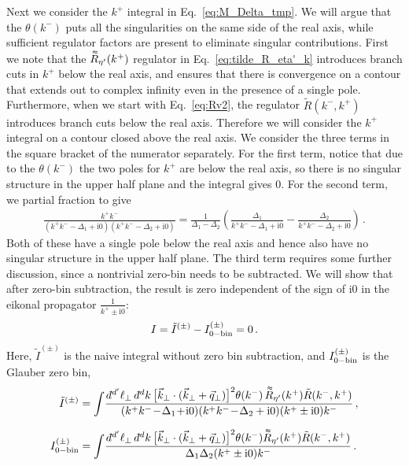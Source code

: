 \documentclass[letterpaper,11pt]{article}
\newcommand{\dbtilde}[1]{\accentset{\approx}{#1}}
\newcommand{\eq}[1]{Eq.~\eqref{eq:#1}}
\newcommand{\img}{\mathrm{i}}
\newcommand{\dbar}{d\hspace*{-0.08em}\bar{}\hspace*{0.1em}}
\begin{document}
Next we consider the $k^+$ integral in \eq{M_Delta_tmp}.
We will argue that the $\theta(k^-)$ puts all the singularities on the same side of the real axis, while sufficient regulator factors are present to eliminate singular contributions.   
First we note that the $\dbtilde R_{\eta'}(k^+)$ regulator in \eq{tilde_R_eta'_k} introduces branch cuts in $k^+$ below the real axis, and ensures that there is convergence on a contour that extends out to complex infinity even in the presence of a single pole. Furthermore, when we start with \eq{Rv2}, the regulator $\tilde R(k^-,k^+)$ introduces branch cuts below the real axis.
Therefore we will consider the $k^+$ integral on a contour closed above the real axis. We consider the three terms in the square bracket of the numerator separately.
For the first term, notice that due to the $\theta(k^-)$ the two poles for $k^+$ are below the real axis, so there is no singular structure in the upper half plane and the integral gives $0$.
For the second term, we partial fraction to give
\begin{align}
  \frac{k^+k^-}{(k^+k^-\!-\!\Delta_1\!+\!\img0)
  (k^+k^-\!-\! \Delta_2+\img0)}=
  \frac{1}{\Delta_1-\Delta_2}
  \left(\frac{\Delta_1}{k^+k^-\!-\!\Delta_1\!+\!\img0}-\frac{\Delta_2}{k^+k^-\!-\!\Delta_2\!+\!\img0}\right)
  \,.
\end{align}
Both of these have a single pole below the real axis and hence also have no singular structure in the upper half plane.
The third term requires some further discussion, since a nontrivial zero-bin needs to be subtracted. We will show that after zero-bin subtraction, the result is zero independent of the sign of $\img0$ in the eikonal propagator $\frac{1}{k^+\pm\img0}$:
\begin{align}\label{eq:I_pm}
  I=\tilde I^{(\pm)}-I_{\rm 0-bin}^{(\pm)}=0\,.
\end{align}
Here, $\tilde I^{(\pm)}$ is the naive integral without zero bin subtraction, and $I_{\rm 0-bin}^{(\pm)}$ is the Glauber zero bin,
\begin{align}\label{eq:I_tilde}
  \tilde I^{(\pm)} &= \int\! \frac{\dbar^{d'}\ell_\perp\, \dbar^d k 
  \,\bigl[\vec k_\perp\cdot (\vec k_\perp+\vec q_\perp)\bigr]^2 \theta(k^-)
  \,   \dbtilde R_{\eta'}(k^+)
  \tilde R(k^-,k^+)
  }
  {(k^+k^-\!-\!\Delta_1\!+\!\img0)
  (k^+k^-\!-\! \Delta_2+\img0)
  (k^+\pm\img0)k^-
  }
  \,,
  \\[.1in]
  \label{eq:I_0bin}
  I_{\rm 0-bin}^{(\pm)} &=\int\! \frac{\dbar^{d'}\ell_\perp\, \dbar^d k 
  \,\bigl[\vec k_\perp\cdot (\vec k_\perp+\vec q_\perp)\bigr]^2 \theta(k^-)
  \dbtilde R_{\eta'}(k^+)
  \tilde R(k^-,k^+)
  }
  {\Delta_1\Delta_2
  (k^+\pm\img0)k^-
  }
  \,.
\end{align}
\end{document}
